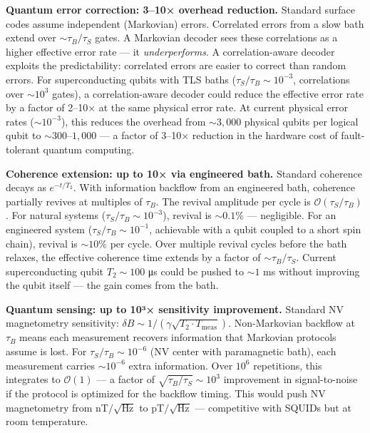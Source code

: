 \documentclass[
]{article}
\begin{document}
\textbf{Quantum error correction: 3--10× overhead reduction.} Standard
surface codes assume independent (Markovian) errors. Correlated errors
from a slow bath extend over \(\sim \tau_B / \tau_S\) gates. A Markovian
decoder sees these correlations as a higher effective error rate --- it
\emph{underperforms}. A correlation-aware decoder exploits the
predictability: correlated errors are easier to correct than random
errors. For superconducting qubits with TLS baths
(\(\tau_S / \tau_B \sim 10^{-3}\), correlations over \(\sim 10^3\)
gates), a correlation-aware decoder could reduce the effective error
rate by a factor of 2--10× at the same physical error rate. At current
physical error rates (\(\sim 10^{-3}\)), this reduces the overhead from
\(\sim 3{,}000\) physical qubits per logical qubit to
\(\sim 300\)--\(1{,}000\) --- a factor of 3--10× reduction in the
hardware cost of fault-tolerant quantum computing.

\textbf{Coherence extension: up to 10× via engineered bath.} Standard
coherence decays as \(e^{-t/T_2}\). With information backflow from an
engineered bath, coherence partially revives at multiples of \(\tau_B\).
The revival amplitude per cycle is \(\mathcal{O}(\tau_S / \tau_B)\). For
natural systems (\(\tau_S / \tau_B \sim 10^{-3}\)), revival is
\(\sim 0.1\%\) --- negligible. For an engineered system
(\(\tau_S / \tau_B \sim 10^{-1}\), achievable with a qubit coupled to a
short spin chain), revival is \(\sim 10\%\) per cycle. Over multiple
revival cycles before the bath relaxes, the effective coherence time
extends by a factor of \(\sim \tau_B / \tau_S\). Current superconducting
qubit \(T_2 \sim 100\) μs could be pushed to \(\sim 1\) ms without
improving the qubit itself --- the gain comes from the bath.

\textbf{Quantum sensing: up to 10³× sensitivity improvement.} Standard
NV magnetometry sensitivity:
\(\delta B \sim 1 / (\gamma \sqrt{T_2 \cdot T_{\text{meas}}})\).
Non-Markovian backflow at \(\tau_B\) means each measurement recovers
information that Markovian protocols assume is lost. For
\(\tau_S / \tau_B \sim 10^{-6}\) (NV center with paramagnetic bath),
each measurement carries \(\sim 10^{-6}\) extra information. Over
\(10^6\) repetitions, this integrates to \(\mathcal{O}(1)\) --- a factor
of \(\sqrt{\tau_B / \tau_S} \sim 10^3\) improvement in signal-to-noise
if the protocol is optimized for the backflow timing. This would push NV
magnetometry from nT\(/\sqrt{\text{Hz}}\) to pT\(/\sqrt{\text{Hz}}\) ---
competitive with SQUIDs but at room temperature.
\end{document}
